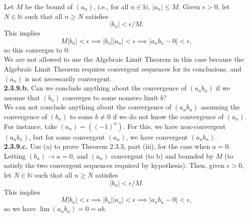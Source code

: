 \documentclass[12pt,letterpaper]{article}
\begin{document}
Let \(M\) be the bound of \((a_{n})\), i.e., for all \(n\in \mathbb{N}\), \(|a_{n}| \leq M\). Given \(\epsilon > 0\), let \(N \in \mathbb{N}\) such that all \(n \geq N\) satisfies \[|b_{n}| < \epsilon/M.\] This implies \[M|b_{n}| < \epsilon \implies |b_{n}||a_{n}| < \epsilon \implies |a_{n}b_{n} - 0| < \epsilon,\] so this converges to \(0\). \\

We are not allowed to use the Algebraic Limit Theorem in this case because the Algebraic Limit Theorem requires convergent sequences for its conclusions, and \((a_{n})\) is not necessarily convergent. \\

\textbf{2.3.9.b.} Can we conclude anything about the convergence of \((a_{n}b_{n})\) if we assume that \((b_{n})\) converges to some nonzero limit \(b\)? \\

We can not conclude anything about the convergence of \((a_{n}b_{n})\) assuming the convergence of \((b_{n})\) to some \(b \neq 0\) if we do not know the convergence of \((a_{n})\). For instance, take \((a_{n}) = ((-1)^{n})\). For this, we have non-convergent \((a_{n}b_{n})\), but for some convergent \((a_{n})\), we have convergent \((a_{n}b_{n})\). \\

\textbf{2.3.9.c.} Use (a) to prove Theorem 2.3.3, part (iii), for the case when \(a = 0\). \\

Letting \((b_{n}) \to a = 0\), and \((a_{n})\) convergent (to b) and bounded by \(M\) (to satisfy the two convergent sequences required by hypothesis). Then, given \(\epsilon > 0\), let \(N \in \mathbb{N}\) such that all \(n \geq N\) satisfies \[|b_{n}| < \epsilon/M.\] This implies \[M|b_{n}| < \epsilon \implies |b_{n}||a_{n}| < \epsilon \implies |a_{n}b_{n} - 0| < \epsilon,\] so we have \(\lim (a_{n}b_{n}) = 0 = ab.\) \\
\end{document}
